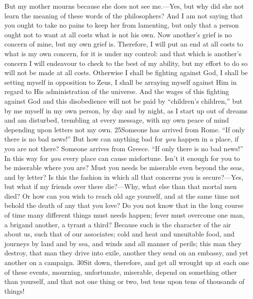 But my mother mourns because she does not see me.—Yes, but why did she not learn the meaning of these words of the philosophers? And I am not saying that you ought to take no pains to keep her from lamenting, but only that a person ought not to want at all costs what is not his own. Now another's grief is no concern of mine, but my own grief is. Therefore, I will put an end at all costs to what is my own concern, for it is under my control: and that which is another's concern I will endeavour to check to the best of my ability, but my effort to do so will not be made at all costs. Otherwise I shall be fighting against God, I shall be setting myself in opposition to Zeus, I shall be arraying myself against Him in regard to His administration of the universe. And the wages of this fighting against God and this disobedience will not be paid by ``children's children,'' but by me myself in my own person, by day and by night, as I start up out of dreams and am disturbed, trembling at every message, with my own peace of mind depending upon letters not my own. 25Someone has arrived from Rome. ``If only there is no bad news!'' But how can anything bad for \emph{you} happen in a place, if you are not there? Someone arrives from Greece. ``If only there is no bad news!'' In this way for \emph{you} every place can cause misfortune. Isn't it enough for you to be miserable where you are? Must you needs be miserable even beyond the seas, and by letter? Is this the fashion in which all that concerns you is secure?—Yes, but what if my friends over there die?—Why, what else than that mortal men died? Or how can you wish to reach old age yourself, and at the same time not behold the death of any that you love? Do you not know that in the long course of time many different things must needs happen; fever must overcome one man, a brigand another, a tyrant a third? Because such is the character of the air about us, such that of our associates; cold and heat and unsuitable food, and journeys by land and by sea, and winds and all manner of perils; this man they destroy, that man they drive into exile, another they send on an embassy, and yet another on a campaign. 30Sit down, therefore, and get all wrought up at each one of these events, mourning, unfortunate, miserable, depend on something other than yourself, and that not one thing or two, but tens upon tens of thousands of things!


